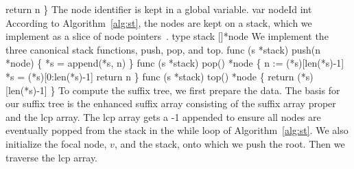           return n
\}
\nwendcode{}\nwdocspar
The node identifier is kept in a global variable.
\nwenddocs{}\endmoddef\nwstartdeflinemarkup{}\nwenddeflinemarkup
var nodeId int
\nwendcode{}\nwdocspar
According to Algorithm~\ref{alg:st}, the nodes are kept on a stack,
which we implement as a slice of node pointers~\cite[p. 92]{don16:go}.
\nwenddocs{}\plusendmoddef\nwstartdeflinemarkup{}\nwenddeflinemarkup
type stack []*node
\nwendcode{}\nwdocspar
We implement the three canonical stack functions, push, pop, and top.
\nwenddocs{}\plusendmoddef\nwstartdeflinemarkup{}\nwenddeflinemarkup
func (s *stack) push(n *node) \{ *s = append(*s, n) \}
func (s *stack) pop() *node \{
          n := (*s)[len(*s)-1]
          *s = (*s)[0:len(*s)-1]
          return n
\}
func (s *stack) top() *node \{ return (*s)[len(*s)-1] \}
\nwendcode{}\nwdocspar
To compute the suffix tree, we first prepare the data. The basis for
our suffix tree is the enhanced suffix array consisting of the suffix
array proper and the lcp array. The lcp array gets a -1 appended to
ensure all nodes are eventually popped from the stack in the while
loop of Algorithm~\ref{alg:st}.  We also initialize the focal node,
$v$, and the stack, onto which we push the root. Then we traverse the
lcp array.
\nwenddocs{}\endmoddef\nwstartdeflinemarkup{}\nwenddeflinemarkup
